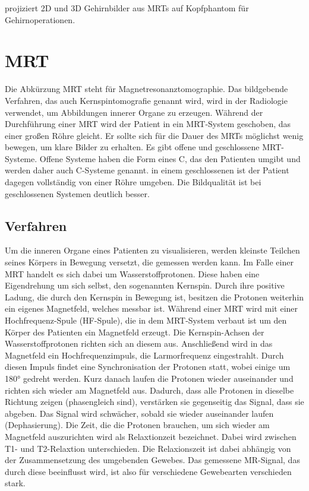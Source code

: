 \cite{Calvin01} projiziert 2D und 3D Gehirnbilder aus MRTs auf Kopfphantom für Gehirnoperationen.

\section{MRT}
\label{mrt}												 %

Die Abkürzung MRT steht für Magnetresonanztomographie. Das bildgebende Verfahren, das auch Kernspintomografie genannt wird, wird in der Radiologie verwendet, um Abbildungen innerer Organe zu erzeugen. Während der Durchführung einer MRT wird der Patient in ein MRT-System geschoben, das einer großen Röhre gleicht. Er sollte sich für die Dauer des MRTs möglichst wenig bewegen, um klare Bilder zu erhalten.
Es gibt offene und geschlossene MRT-Systeme. Offene Systeme haben die Form eines C, das den Patienten umgibt und werden daher auch C-Systeme genannt. in einem geschlossenen ist der Patient dagegen vollständig von einer Röhre umgeben. Die Bildqualität ist bei geschlossenen Systemen deutlich besser.
 	
\subsection{Verfahren}

Um die inneren Organe eines Patienten zu visualisieren, werden kleinste Teilchen seines Körpers in Bewegung versetzt, die gemessen werden kann. Im Falle einer MRT handelt es sich dabei um Wasserstoffprotonen. Diese haben eine Eigendrehung um sich selbst, den sogenannten Kernspin. Durch ihre positive Ladung, die durch den Kernspin in Bewegung ist, besitzen die Protonen weiterhin ein eigenes Magnetfeld, welches messbar ist. 
Während einer MRT wird mit einer Hochfrequenz-Spule (HF-Spule), die in dem MRT-System verbaut ist um den Körper des Patienten ein Magnetfeld erzeugt. Die Kernspin-Achsen der Wasserstoffprotonen richten sich an diesem aus. Anschließend wird in das Magnetfeld ein Hochfrequenzimpuls, die Larmorfrequenz eingestrahlt. Durch diesen Impuls findet eine Synchronisation der Protonen statt, wobei einige um 180° gedreht werden. Kurz danach laufen die Protonen wieder auseinander und richten sich wieder am Magnetfeld aus. 
Dadurch, dass alle Protonen in dieselbe Richtung zeigen (phasengleich sind), verstärken sie gegenseitig das Signal, dass sie abgeben. Das Signal wird schwächer, sobald sie wieder auseinander laufen (Dephasierung).
Die Zeit, die die Protonen brauchen, um sich wieder am Magnetfeld auszurichten wird als Relaxtionzeit bezeichnet. Dabei wird zwischen T1- und T2-Relaxtion unterschieden.
Die Relaxionszeit ist dabei abhängig von der Zusammensetzung des umgebenden Gewebes. Das gemessene MR-Signal, das durch diese beeinflusst wird, ist also für verschiedene Gewebearten verschieden stark.
\cite{weishaupt09}

